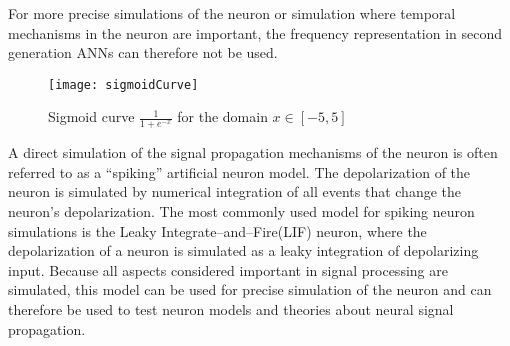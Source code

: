 	For more precise simulations of the neuron or simulation where temporal mechanisms in the neuron are important, the frequency representation in second generation ANNs can therefore not be used.  %


\begin{figure}[hbt!p]
	\centering
	\texttt{[image: sigmoidCurve]}
	\caption[The sigmoid curve that is often used to compute the output of a node in a second generation ANN]{Sigmoid curve $\frac{1}{1+e^{-x}}$ for the domain $x\in [-5,5]$}
	\label{figSigmoidCurve}
\end{figure}
	
	A direct simulation of the signal propagation mechanisms of the neuron is often referred to as a ``spiking'' artificial neuron model. %
	The depolarization of the neuron is simulated by numerical integration of all events that change the neuron's depolarization.
	The most commonly used model for spiking neuron simulations is the Leaky Integrate--and--Fire(LIF) neuron, where the depolarization of a neuron is simulated as a leaky integration of depolarizing input\cite{florian03}.
	Because all aspects considered important in signal processing are simulated, this model can be used for precise simulation of the neuron and can therefore be used to test neuron models and theories about neural signal propagation.

